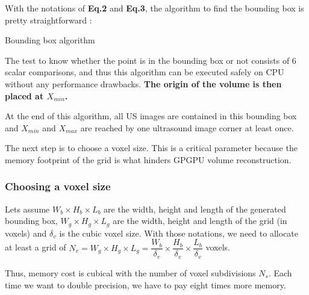 \documentclass[12pt,journal,compsoc]{IEEEtran}
\begin{document}
With the notations of \textbf{Eq.2} and \textbf{Eq.3}, the algorithm to find the bounding box is pretty straightforward :

\begin{samepage}
\begin{algorithm}
\caption{Bounding box algorithm}
\label{bbox_algo}
\end{algorithm}
\end{samepage}

\newpage
The test to know whether the point is in the bounding box or not consists of 6 scalar comparisons, and thus this algorithm can be executed safely on CPU without any performance drawbacks.
\textbf{The origin of the volume is then placed at $X_{min}$.}

At the end of this algorithm, all US images are contained in this bounding box and $X_{min}$ and $X_{max}$ are reached by one ultrasound image corner at least once.

The next step is to choose a voxel size. This is a critical parameter because the memory footprint of the grid is what hinders GPGPU volume reconstruction. 

\subsubsection{Choosing a voxel size}

Lets assume $W_b\times H_b\times L_b$ are the width, height and length of the generated bounding box, $W_g\times H_g\times L_g$ are the width, height and length of the grid (in voxels) and $\delta_v$ is the cubic voxel size. With those notations, we need to allocate at least a grid of $N_v = W_g\times H_g\times L_g =  \dfrac{W_b}{\delta_v}\times \dfrac{H_b}{\delta_v}\times \dfrac{L_b}{\delta_v}$ voxels. \par

\vspace{0.2cm}
Thus, memory cost is cubical with the number of voxel subdivisions $N_s$. Each time we want to double precision, we have to pay eight times more memory.
\end{document}
